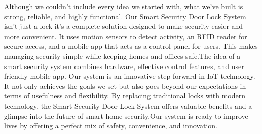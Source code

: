 \documentclass[USenglish,oneside,twocolumn]{article}
\begin{document}
Although we couldn’t include every idea we started with, what we’ve built is strong, reliable, and highly functional. Our Smart Security Door Lock System isn’t just a lock it’s a complete solution designed to make security easier and more convenient. It uses motion sensors to detect activity, an RFID reader for secure access, and a mobile app that acts as a control panel for users. This makes managing security simple while keeping homes and offices safe.The idea of a smart security system combines  hardware, effective control features, and user friendly mobile app. Our system is an innovative step forward in IoT technology. It not only achieves the goals we set but also goes beyond our expectations in terms of usefulness and flexibility. By replacing traditional locks with modern technology, the Smart Security Door Lock System offers valuable benefits and a glimpse into the future of smart home security.Our system is ready to improve lives by offering a perfect mix of safety, convenience, and innovation.


	\printbibliography[title={References}]
\end{document}
